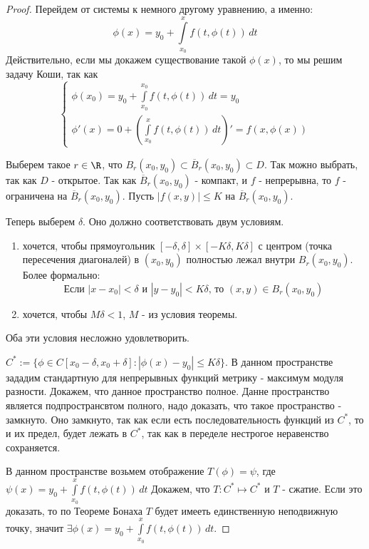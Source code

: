 \begin{theorem}[Пикара]
\begin{proof}
    Перейдем от системы к немного другому уравнению, а именно: 
    \[
      \phi(x) = y_0 + \int\limits_{x_0}^{x}{f(t, \phi(t))\,dt}
    \]
    Действительно, если мы докажем существование такой $\phi(x)$, то мы решим задачу Коши, так как
    \[\begin{cases}
      \phi(x_0) = y_0 + \int\limits_{x_0}^{x_0}{f(t, \phi(t))\,dt} = y_0 \\
      \phi'(x) = 0 + \left(\int\limits_{x_0}^{x}{f(t, \phi(t))\,dt}\right)' = f(x, \phi(x))
    \end{cases}\]
    \par Выберем такое $r \in \R$, что $B_r(x_0, y_0) \subset \overline{B}_r(x_0, y_0) \subset D$. Так можно выбрать, так как $D$ - открытое.
    Так как $\overline{B}_r(x_0, y_0)$ - компакт, и $f$ - непрерывна, то $f$ - ограничена на $\overline{B}_r(x_0, y_0)$. Пусть $|f(x, y)| \le K$ на $\overline{B}_r(x_0, y_0)$.
    \par Теперь выберем $\delta$. Оно должно соответствовать двум условиям. 
    \begin{enumerate}
      \item хочется, чтобы прямоугольник $[-\delta, \delta] \times [-K\delta, K\delta]$ с центром (точка пересечения диагоналей) в $(x_0, y_0)$ полностью лежал внутри $B_r(x_0, y_0)$. Более формально: 
    \[ \text{Если } |x - x_0| < \delta \text{ и } |y - y_0| < K\delta \text{, то } (x, y) \in B_r(x_0, y_0) \]
      \item хочется, чтобы $M\delta < 1$, $M$ - из условия теоремы.
    \end{enumerate}
    Оба эти условия несложно удовлетворить.
    \par $C^* := \{\phi \in C[x_0 - \delta, x_0 + \delta] : |\phi(x) - y_0| \le  K\delta\}$. В данном пространстве зададим стандартную для непрерывных функций метрику - максимум модуля разности.
    Докажем, что данное пространство полное. Данне пространство является подпространсвтом полного, надо доказать, что такое пространство - замкнуто. Оно замкнуто, так как если есть последовательность функций из $C^*$, то и их предел, будет лежать в $C^*$, так как в переделе нестрогое неравенство сохраняется. 
    \par В данном пространстве возьмем отображение $T(\phi) = \psi$, где $\psi(x) = y_0 + \int\limits_{x_0}^{x} f(t, \phi(t))\, dt$
    Докажем, что $T:C^* \mapsto C^*$ и $T$ - сжатие. Если это доказать, то по Теореме Бонаха $T$ будет имееть единственную неподвижную точку, значит $\exists \phi(x) = y_0 + \int\limits_{x_0}^{x} f(t, \phi(t))\, dt$.

\end{proof}
\end{theorem}
